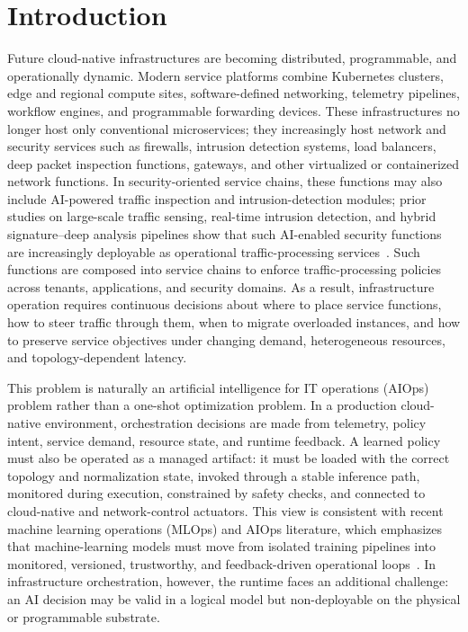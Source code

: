 \documentclass[final,5p]{elsarticle}
\newcommand{\rev}[1]{\textcolor{BrickRed}{#1}}
\begin{document}
\section{Introduction}
\label{sec:introduction}

Future cloud-native infrastructures are becoming distributed, programmable, and operationally dynamic. Modern service platforms combine Kubernetes clusters, edge and regional compute sites, software-defined networking, telemetry pipelines, workflow engines, and programmable forwarding devices. These infrastructures no longer host only conventional microservices; they increasingly host network and security services such as firewalls, intrusion detection systems, load balancers, deep packet inspection functions, gateways, and other virtualized or containerized network functions. In security-oriented service chains, these functions may also include AI-powered traffic inspection and intrusion-detection modules; prior studies on large-scale traffic sensing, real-time intrusion detection, and hybrid signature--deep analysis pipelines show that such AI-enabled security functions are increasingly deployable as operational traffic-processing services~\cite{cSDAID22}. Such functions are composed into service chains to enforce traffic-processing policies across tenants, applications, and security domains. As a result, infrastructure operation requires continuous decisions about where to place service functions, how to steer traffic through them, when to migrate overloaded instances, and how to preserve service objectives under changing demand, heterogeneous resources, and topology-dependent latency.

This problem is naturally an \rev{artificial intelligence for IT operations (AIOps)} problem rather than a one-shot optimization problem. In a production cloud-native environment, orchestration decisions are made from telemetry, policy intent, service demand, resource state, and runtime feedback. A learned policy must also be operated as a managed artifact: it must be loaded with the correct topology and normalization state, invoked through a stable inference path, monitored during execution, constrained by safety checks, and connected to cloud-native and network-control actuators. This view is consistent with recent \rev{machine learning operations (MLOps)} and AIOps literature, which emphasizes that machine-learning models must move from isolated training pipelines into monitored, versioned, trustworthy, and feedback-driven operational loops~\cite{kreuzberger2023mlops,diazdearcaya2024joint,eken2025mlops,bayram2025trustworthy,zhang2025aiopsllm,eramo2024architecture}. In infrastructure orchestration, however, the runtime faces an additional challenge: an AI decision may be valid in a logical model but non-deployable on the physical or programmable substrate.
\end{document}
